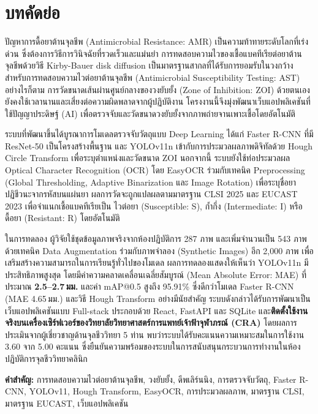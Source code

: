 \newpage

\chapter*{บทคัดย่อ}

ปัญหาการดื้อยาต้านจุลชีพ (Antimicrobial Resistance: AMR) เป็นความท้าทายระดับโลกที่เร่งด่วน ซึ่งต้องการวิธีการวินิจฉัยที่รวดเร็วและแม่นยำ
การทดสอบความไวของเชื้อแบคทีเรียต่อยาต้านจุลชีพด้วยวิธี Kirby-Bauer disk diffusion
เป็นมาตรฐานสากลที่ได้รับการยอมรับในวงกว้างสำหรับการทดสอบความไวต่อยาต้านจุลชีพ (Antimicrobial Susceptibility Testing: AST)
อย่างไรก็ตาม การวัดขนาดเส้นผ่านศูนย์กลางของวงยับยั้ง (Zone of Inhibition: ZOI) ด้วยตนเองยังคงใช้เวลานานและเสี่ยงต่อความผิดพลาดจากผู้ปฏิบัติงาน
โครงงานนี้จึงมุ่งพัฒนาเว็บแอปพลิเคชันที่ใช้ปัญญาประดิษฐ์ (AI) เพื่อตรวจจับและวัดขนาดวงยับยั้งจากภาพถ่ายจานเพาะเชื้อโดยอัตโนมัติ

ระบบที่พัฒนาขึ้นได้บูรณาการโมเดลตรวจจับวัตถุแบบ Deep Learning ได้แก่ Faster R-CNN
ที่มี ResNet-50 เป็นโครงสร้างพื้นฐาน และ YOLOv11n เข้ากับการประมวลผลภาพดิจิทัลด้วย Hough Circle Transform
เพื่อระบุตำแหน่งและวัดขนาด ZOI นอกจากนี้ ระบบยังใช้ท่อประมวลผล Optical Character Recognition (OCR)
โดย EasyOCR ร่วมกับเทคนิค Preprocessing (Global Thresholding, Adaptive Binarization และ Image Rotation)
เพื่อระบุชื่อยาปฏิชีวนะจากรหัสบนแผ่นยา
ผลการวัดจะถูกแปลผลตามมาตรฐาน CLSI 2025 และ EUCAST 2023
เพื่อจำแนกเชื้อแบคทีเรียเป็น ไวต่อยา (Susceptible: S), ก้ำกึ่ง (Intermediate: I) หรือ ดื้อยา (Resistant: R) โดยอัตโนมัติ

ในการทดลอง ผู้วิจัยใช้ชุดข้อมูลภาพจริงจากห้องปฏิบัติการ 287 ภาพ และเพิ่มจำนวนเป็น 543 ภาพด้วยเทคนิค Data Augmentation
ร่วมกับภาพจำลอง (Synthetic Images) อีก 2,000 ภาพ เพื่อเสริมสร้างความสามารถในการเรียนรู้ทั่วไปของโมเดล
ผลการทดลองแสดงให้เห็นว่า YOLOv11n มีประสิทธิภาพสูงสุด
โดยมีค่าความคลาดเคลื่อนเฉลี่ยสัมบูรณ์ (Mean Absolute Error: MAE) ที่ประมาณ \textbf{2.5--2.7\,มม.}
และค่า mAP@0.5 สูงถึง 95.91\% ซึ่งดีกว่าโมเดล Faster R-CNN (MAE 4.65\,มม.) และวิธี Hough Transform อย่างมีนัยสำคัญ
ระบบดังกล่าวได้รับการพัฒนาเป็นเว็บแอปพลิเคชันแบบ Full-stack ประกอบด้วย React, FastAPI และ SQLite
และ\textbf{ติดตั้งใช้งานจริงบนเครื่องเซิร์ฟเวอร์ของวิทยาลัยวิทยาศาสตร์การแพทย์เจ้าฟ้าจุฬาภรณ์ (CRA)}
โดยผลการประเมินจากผู้เชี่ยวชาญด้านจุลชีววิทยา 5 ท่าน พบว่าระบบได้รับคะแนนความเหมาะสมในการใช้งาน 3.60 จาก 5.00 คะแนน
ซึ่งยืนยันความพร้อมของระบบในการสนับสนุนกระบวนการทำงานในห้องปฏิบัติการจุลชีววิทยาคลินิก

\noindent\textbf{คำสำคัญ:} การทดสอบความไวต่อยาต้านจุลชีพ, วงยับยั้ง, ดีพเลิร์นนิง, การตรวจจับวัตถุ,
Faster R-CNN, YOLOv11, Hough Transform, EasyOCR, การประมวลผลภาพ, มาตรฐาน CLSI, มาตรฐาน EUCAST, เว็บแอปพลิเคชัน

\newpage
